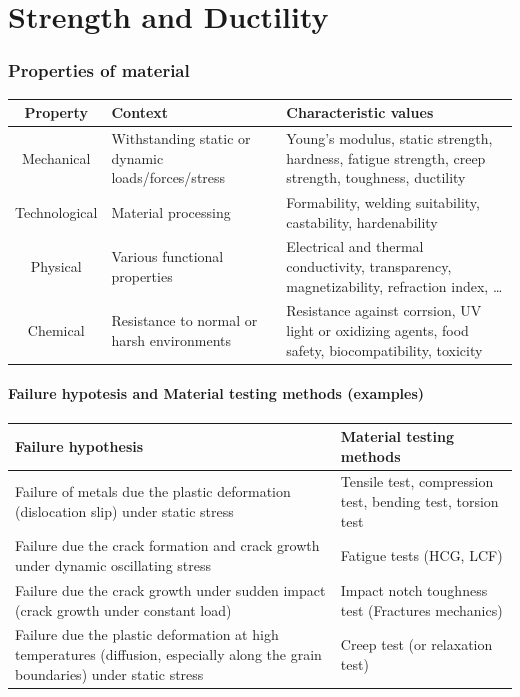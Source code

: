\documentclass{article}
\begin{document}
\newpage
\part{Strength and Ductility}
\section{Properties of material}
\begin{table}[h!]
  \centering
  \begin{tabular}{|c|p{5cm}|p{7cm}|}
    \hline
    \textbf{Property} & \textbf{Context} & \textbf{Characteristic values}\\
    \hline
    Mechanical & Withstanding static or dynamic loads/forces/stress & Young's modulus, static strength, hardness, fatigue strength, creep strength, toughness, ductility\\
    \hline
    Technological & Material processing & Formability, welding suitability, castability, hardenability\\
    \hline
    Physical & Various functional properties & Electrical and thermal conductivity, transparency, magnetizability, refraction index, \ldots\\
    \hline
    Chemical & Resistance to normal or harsh environments & Resistance against corrsion, UV light or oxidizing agents, food safety, biocompatibility, toxicity\\
    \hline
  \end{tabular}
\end{table}

\subsection{Failure hypotesis and Material testing methods (examples)}
\begin{table}[h!]
  \centering
  \begin{tabular}{|p{7cm}|l|}
    \hline
    \textbf{Failure hypothesis} & \textbf{Material testing methods}\\
    \hline
    Failure of metals due the plastic deformation (dislocation slip) under static stress & Tensile test, compression test, bending test, torsion test\\
    \hline
    Failure due the crack formation and crack growth under dynamic oscillating stress & Fatigue tests (HCG, LCF)\\
    \hline
    Failure due the crack growth under sudden impact (crack growth under constant load) & Impact notch toughness test (Fractures mechanics)\\
    \hline
    Failure due the plastic deformation at high temperatures (diffusion, especially along the grain boundaries) under static stress & Creep test (or relaxation test)\\
    \hline
  \end{tabular}
\end{table}
\end{document}
